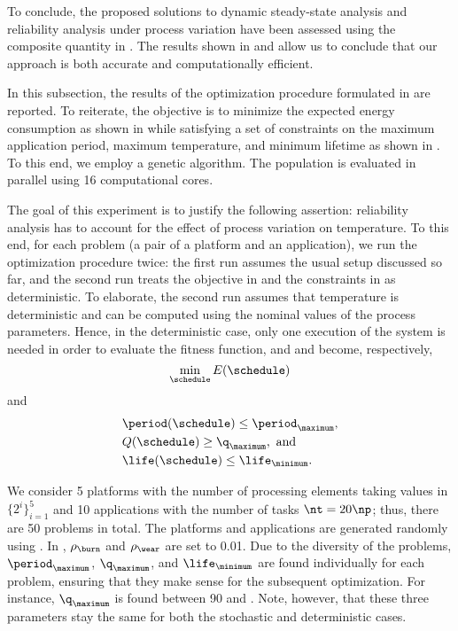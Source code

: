 To conclude, the proposed solutions to dynamic steady-state analysis and
reliability analysis under process variation have been assessed using the
composite quantity in . The results shown in
 and  allow us
to conclude that our approach is both accurate and computationally efficient.


In this subsection, the results of the optimization procedure formulated in
 are reported. To reiterate, the objective
is to minimize the expected energy consumption as shown in
 while satisfying a set of constraints on the
maximum application period, maximum temperature, and minimum lifetime as shown
in . To this end, we employ a genetic
algorithm. The population is evaluated in parallel using 16 computational cores.

The goal of this experiment is to justify the following assertion: reliability
analysis has to account for the effect of process variation on temperature. To
this end, for each problem (a pair of a platform and an application), we run the
optimization procedure twice: the first run assumes the usual setup discussed so
far, and the second run treats the objective in
 and the constraints in
 as deterministic. To elaborate, the second
run assumes that temperature is deterministic and can be computed using the
nominal values of the process parameters. Hence, in the deterministic case, only
one execution of the system is needed in order to evaluate the fitness function,
and  and 
become, respectively,
\[
    \min_{\schedule} E(\schedule)
\]
and
\[
  \begin{split}
    & \period(\schedule) \leq \period_\maximum, \\
    & Q(\schedule) \geq \q_\maximum, \text{ and} \\
    & \life(\schedule) \leq \life_\minimum.
  \end{split}
\]

We consider 5 platforms with the number of processing elements \np taking values
in $\{ 2^i \}_{i = 1}^5$ and 10 applications with the number of tasks $\nt = 20
\np$; thus, there are 50 problems in total. The platforms and applications are
generated randomly using  \cite{dick1998}. In
, $\rho_\burn$ and $\rho_\wear$ are set to
0.01. Due to the diversity of the problems, $\period_\maximum$, $\q_\maximum$,
and $\life_\minimum$ are found individually for each problem, ensuring that they
make sense for the subsequent optimization. For instance, $\q_\maximum$ is found
between 90 and . Note, however, that these three parameters stay
the same for both the stochastic and deterministic cases.

